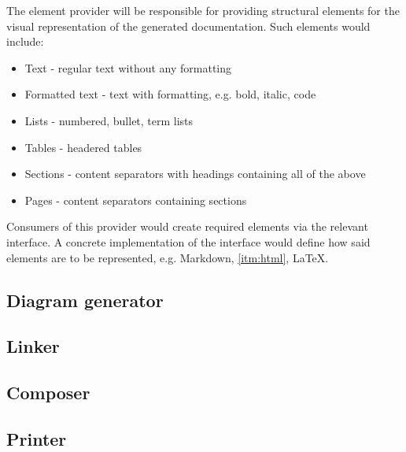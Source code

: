 The element provider will be responsible for providing structural elements for the visual representation of the generated documentation. Such elements would include:
\begin{itemize}
    \item Text - regular text without any formatting
    \item Formatted text - text with formatting, e.g. bold, italic, code
    \item Lists - numbered, bullet, term lists
    \item Tables - headered tables
    \item Sections - content separators with headings containing all of the above
    \item Pages - content separators containing sections
\end{itemize}

Consumers of this provider would create required elements via the relevant interface.
A concrete implementation of the interface would define how said elements are to be represented, e.g. Markdown, \ref{itm:html}, \LaTeX.

\subsection{Diagram generator}

\subsection{Linker}

\subsection{Composer}

\subsection{Printer}